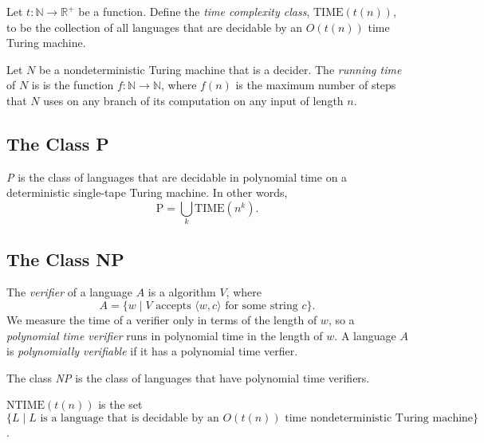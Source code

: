 \documentclass[11pt]{article}
\begin{document}
\begin{definition}
Let $t: \mathbb{N} \rightarrow \mathbb{R}^+$ be a function. Define the \emph{time complexity class},
$\mathrm{TIME}(t(n))$, to be the collection of all languages that are decidable by an $O(t(n))$ time Turing
machine.
\end{definition}

\begin{definition}
Let $N$ be a nondeterministic Turing machine that is a decider. The \emph{running time} of $N$ is
is the function $f: \mathbb{N} \rightarrow \mathbb{N}$, where $f(n)$ is the maximum number of steps
that $N$ uses on any branch of its computation on any input of length $n$.
\end{definition}

\subsection{The Class P}

\begin{definition}
\emph{P} is the class of languages that are decidable in polynomial time on a deterministic
single-tape Turing machine. In other words,
\[
  \mathrm{P} = \bigcup_k \mathrm{TIME}(n^k).
\]
\end{definition}

\subsection{The Class NP}

\begin{definition}
The \emph{verifier} of a language $A$ is a algorithm $V$, where
\[
  A = \{w \mid V \text{ accepts }\langle w,c \rangle \text{ for some string }c\}.
\]
We measure the time of a verifier only in terms of the length of $w$, so a \emph{polynomial time
verifier} runs in polynomial time in the length of $w$. A language $A$ is \emph{polynomially
verifiable} if it has a polynomial time verfier.
\end{definition}

\begin{definition}
The class \emph{NP} is the class of languages that have polynomial time verifiers.
\end{definition}

\begin{definition}
$\mathrm{NTIME}(t(n))$ is the set \\ $\{L \mid L \text{ is a language that is decidable by an }
O(t(n)) \text{ time nondeterministic Turing machine}\}$.
\end{definition}
\end{document}
